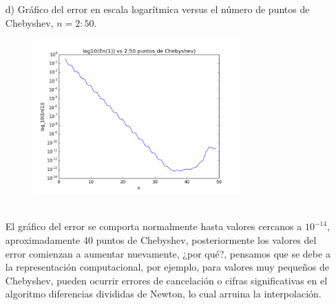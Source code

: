 \documentclass[spanish, fleqn]{article}
\begin{document}
\begin{enumerate}
		\item[d)]
			Gráfico del error en escala logarítmica versus el número
			de puntos de Chebyshev, $n = 2:50$.
			\begin{figure}[ht!]
				\centering
				\includegraphics[width=300px]{Graficos/Error-vs-n2.png}
			\end{figure}
			\\El gráfico del error se comporta normalmente hasta
			valores cercanos a $10^{-14}$, aproximadamente 40 puntos
			de Chebyshev, posteriormente los valores del error 
			comienzan a aumentar  nuevamente, ¿por qué?, pensamos que
			se debe a la representación computacional, por ejemplo,
			para valores muy pequeños de Chebyshev, pueden ocurrir
			errores de cancelación o cifras significativas en el 
			algoritmo diferencias divididas de Newton, lo cual 
			arruina la interpolación.
	\end{enumerate}
\newpage
\end{document}
